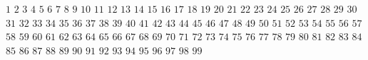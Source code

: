 $1$ \quad
$2$ \quad
$3$ \quad
$4$ \quad
$5$ \quad
$6$ \quad
$7$ \quad
$8$ \quad
$9$ \quad
$10$ \quad
$11$ \quad
$12$ \quad
$13$ \quad
$14$ \quad
$15$ \quad
$16$ \quad
$17$ \quad
$18$ \quad
$19$ \quad
$20$ \quad
$21$ \quad
$22$ \quad
$23$ \quad
$24$ \quad
$25$ \quad
$26$ \quad
$27$ \quad
$28$ \quad
$29$ \quad
$30$ \quad
$31$ \quad
$32$ \quad
$33$ \quad
$34$ \quad
$35$ \quad
$36$ \quad
$37$ \quad
$38$ \quad
$39$ \quad
$40$ \quad
$41$ \quad
$42$ \quad
$43$ \quad
$44$ \quad
$45$ \quad
$46$ \quad
$47$ \quad
$48$ \quad
$49$ \quad
$50$ \quad
$51$ \quad
$52$ \quad
$53$ \quad
$54$ \quad
$55$ \quad
$56$ \quad
$57$ \quad
$58$ \quad
$59$ \quad
$60$ \quad
$61$ \quad
$62$ \quad
$63$ \quad
$64$ \quad
$65$ \quad
$66$ \quad
$67$ \quad
$68$ \quad
$69$ \quad
$70$ \quad
$71$ \quad
$72$ \quad
$73$ \quad
$74$ \quad
$75$ \quad
$76$ \quad
$77$ \quad
$78$ \quad
$79$ \quad
$80$ \quad
$81$ \quad
$82$ \quad
$83$ \quad
$84$ \quad
$85$ \quad
$86$ \quad
$87$ \quad
$88$ \quad
$89$ \quad
$90$ \quad
$91$ \quad
$92$ \quad
$93$ \quad
$94$ \quad
$95$ \quad
$96$ \quad
$97$ \quad
$98$ \quad
$99$ 
\medskip


